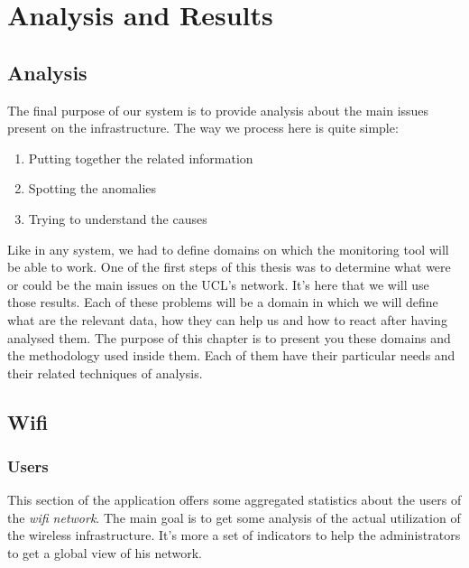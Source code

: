 
\chapter{Analysis and Results} %

\label{Chapter6} %


\section{Analysis}
The final purpose of our system is to provide analysis about the main issues present on the infrastructure. The way we process here is quite simple:

\begin{enumerate}
\item Putting together the related information
\item Spotting the anomalies
\item Trying to understand the causes
\end{enumerate}
Like in any system, we had to define domains on which the monitoring tool will be able to work. One of the first steps of this thesis was to determine what were or could be the main issues on the UCL's network. It's here that we will use those results. Each of these problems will be a domain in which we will define what are the relevant data, how they can help us and how to react after having analysed them. The purpose of this chapter is to present you these domains and the methodology used inside them. Each of them have their particular needs and their related techniques of analysis.

\section{Wifi}
\subsection{Users}
This section of the application offers some aggregated statistics about the users of the \emph{wifi network}. The main goal is to get some analysis of the actual utilization of the wireless infrastructure. It's more a set of indicators to help the administrators to get a global view of his network. 
